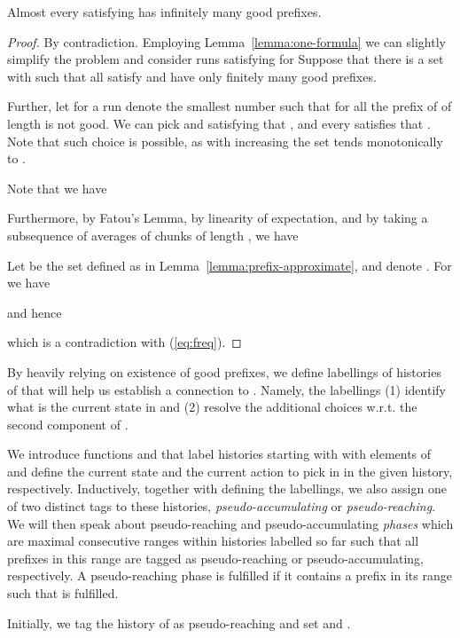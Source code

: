 \documentclass[a4paper,UKenglish]{lipics}
\begin{document}
\begin{lemma}\label{lemma:brew-often}
	Almost every  satisfying 
	has infinitely many good prefixes.
\end{lemma}
\begin{proof}
	By contradiction.
        Employing Lemma~\ref{lemma:one-formula} we can slightly simplify the problem and
        consider runs satisfying   for 
        Suppose that there is a set  with  such that
	all  satisfy  and have only finitely
	many good prefixes.
	
	Further, let  for a run  denote the smallest number such that
	for all  the prefix  of  of length  is not good.
	We can pick  and  satisfying that ,
	and every  satisfies that . 
	Note that such choice is possible, as with increasing  the set  tends monotonically to .
	
	Note that we have
	
	
	Furthermore, by Fatou's Lemma, by linearity of expectation, and by taking a subsequence of averages of chunks of length , we have
	
	
	Let  be the set defined as in Lemma~\ref{lemma:prefix-approximate}, and denote .
	For  we have
	
	and hence
	
	which is a contradiction with (\ref{eq:freq}).
\end{proof}


By heavily relying on existence of good prefixes, we define labellings of histories of  that will help us establish a connection to . Namely, the labellings (1) identify what is the current state in  and (2) resolve the additional choices w.r.t. the second component of .

We introduce functions  and  that label histories starting with  with elements of  and define the current state and the current action to pick in  in the given history, respectively. Inductively, together with defining the labellings, we also assign one of two distinct tags to these histories, {\em pseudo-accumulating} or {\em pseudo-reaching}.
We will then speak about pseudo-reaching and pseudo-accumulating \emph{phases} which are maximal consecutive ranges within histories labelled so far such that all prefixes in this range are tagged as pseudo-reaching or pseudo-accumulating, respectively. A pseudo-reaching phase is fulfilled if it contains a prefix  in its range such that  is fulfilled. 





Initially, we tag the history  of  as pseudo-reaching and set  and .
\end{document}
